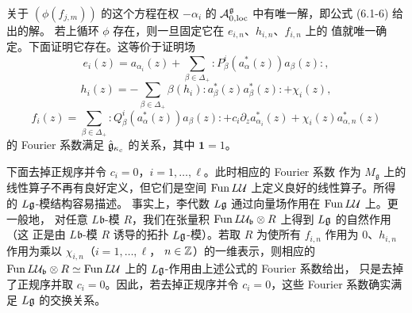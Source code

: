 关于 $(\phi(f_{j,m}))$ 的这个方程在权 $-\alpha_i$ 的
$\mathcal{A}^{\mathfrak g}_{0,\mathrm{loc}}$ 中有唯一解，即公式 (6.1-6) 给出的解。
若上循环 $\phi$ 存在，则一旦固定它在 $e_{i,n}$、$h_{i,n}$、$f_{i,n}$ 上的
值就唯一确定。下面证明它存在。这等价于证明场
\begin{equation}
    e_i(z)=a_{\alpha_i}(z)+\sum_{\beta\in\Delta_+}
    :\!P^i_\beta(a^*_\alpha(z))a_\beta(z)\!:,
    \tag{6.1-7}
\end{equation}
\begin{equation}
    h_i(z)=-\sum_{\beta\in\Delta_+}
    \beta(h_i):\!a^*_\beta(z)a^*_\beta(z)\!:+\chi_i(z),
    \tag{6.1-8}
\end{equation}
\begin{equation}
    f_i(z)=\sum_{\beta\in\Delta_+}
    :\!Q^i_\beta(a^*_\alpha(z))a_\beta(z)\!:
    +c_i\partial_za^*_{\alpha_i}(z)+\chi_i(z)a^*_{\alpha,n}(z)
    \tag{6.1-9}
\end{equation}
的 Fourier 系数满足 $\hat{\mathfrak{g}}_{\kappa_c}$ 的关系，其中 $\mathbf 1=1$。

下面去掉正规序并令 $c_i=0$，$i=1,\dots,\ell$。此时相应的 Fourier 系数
作为 $M_{\mathfrak g}$ 上的线性算子不再有良好定义，但它们是空间
$\mathrm{Fun}\,L\mathcal{U}$ 上定义良好的线性算子。所得的 $L\mathfrak{g}$-模结构容易描述。
事实上，李代数 $L\mathfrak{g}$ 通过向量场作用在 $\mathrm{Fun}\,L\mathcal{U}$ 上。更一般地，
对任意 $L\mathfrak b$-模 $R$，我们在张量积
$\mathrm{Fun}\,L\mathcal{U}_{\mathfrak b}\otimes R$ 上得到 $L\mathfrak{g}$ 的自然作用（这
正是由 $L\mathfrak b$-模 $R$ 诱导的拓扑 $L\mathfrak{g}$-模）。若取 $R$ 为使所有
$f_{i,n}$ 作用为 $0$、$h_{i,n}$ 作用为乘以 $\chi_{i,n}$（$i=1,\dots,\ell$，
$n\in\mathbb{Z}$）的一维表示，则相应的 $\mathrm{Fun}\,L\mathcal{U}_{\mathfrak b}\otimes R
\simeq\mathrm{Fun}\,L\mathcal{U}$ 上的 $L\mathfrak{g}$-作用由上述公式的 Fourier 系数给出，
只是去掉了正规序并取 $c_i=0$。因此，若去掉正规序并令 $c_i=0$，这些 Fourier
系数确实满足 $L\mathfrak{g}$ 的交换关系。

